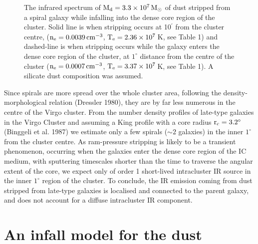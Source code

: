 \documentclass[]{aa}
\begin{document}
\begin{figure}[htb]
\caption[]{The infrared spectrum of 
${\rm M}_{\rm d}=3.3\times 10^7\,{\rm M}_{\odot}$ of dust stripped from a 
spiral
galaxy while infalling into the dense core region of the cluster.
Solid line is when stripping occurs at  10$^{\prime}$ from the cluster centre, 
(${\rm n}_{\rm e}=0.0039\,{\rm cm}^{-3}$, ${\rm T}_{\rm e} = 
2.36\times 10^7$\,K, see 
Table 1) and dashed-line is when stripping occurs while the 
galaxy enters the dense core region of the cluster, at $1^{\circ}$ distance 
from the centre of the cluster (${\rm n}_{\rm e}=0.0007\,{\rm cm}^{-3}$, 
${\rm T}_{\rm e} = 3.37\times 10^7$\,K, see Table 1). 
A silicate dust composition was assumed. }
\end{figure} 

Since spirals are more spread over the whole cluster area, following the
density-morphological relation (Dressler 1980), they are by far less 
numerous in the centre of the Virgo cluster. From the number density profiles
of late-type galaxies in the Virgo Cluster and assuming a King profile with a 
core radius ${\rm r}_{\rm c}=3.2^{\circ}$ (Binggeli et al. 1987) we
estimate only a few spirals ($\sim 2$ galaxies) in the inner $1^{\circ}$ from 
the cluster centre. As ram-pressure stripping is likely to be a transient
phenomenon, occurring when the galaxies enter the dense core region of the 
IC medium, with sputtering timescales shorter than the time to 
traverse the angular extent of the core, we expect only of order 1 short-lived
intracluster IR source in the inner $1^{\circ}$ region of the cluster. 
To conclude, the IR emission coming from dust stripped from late-type 
galaxies is localised and connected to the 
parent galaxy, and does not account for a diffuse intracluster IR component. 


\section{An infall model for the dust}
\end{document}
